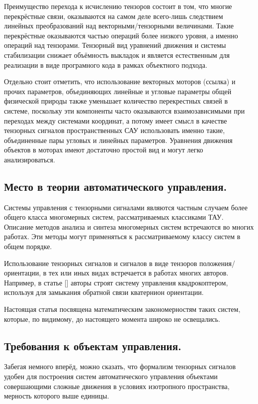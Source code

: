 \documentclass[a4paper]{article}
\begin{document}
Преимущество перехода к исчислению тензоров состоит в том, что многие перекрёстные связи, оказываются на самом деле всего-лишь следствием линейных преобразований над векторными/тензорными величинами. Такие перекрёстные оказываются частью операций более низкого уровня, а именно операций над тензорами. Тензорный вид уравнений движения и системы стабилизации снижает объёмность выкладок и является естественным для реализации в виде програмного кода в рамках объектного подхода. 

Отдельно стоит отметить, что использование векторных моторов (ссылка) и прочих параметров, объединяющих линейные и угловые параметры общей физической природы также уменьшает количество перекрестных связей в системе, поскольку эти компоненты часто оказываются взаимозависимыми при переходах между системами координат, а потому имеет смысл в качестве тензорных сигналов пространственных САУ использовать именно такие, объединенные пары угловых и линейных параметров. Уравнения движения объектов в моторах имеют достаточно простой вид и могут легко анализироваться.

\subsection{Место в теории автоматического управления.}
Системы управления с тензорными сигналами являются частным случаем более общего класса многомерных систем, рассматриваемых классиками ТАУ. Описание методов анализа и синтеза многомерных систем встречаются во многих работах. Эти методы могут применяться к рассматриваемому классу систем в общем порядке. 

Использование тензорных сигналов и сигналов в виде тензоров положения/ориентации, в тех или иных видах встречается в работах многих авторов. Например, в статье [] авторы строят систему управления квадрокоптером, используя для замыкания обратной связи кватернион ориентации. 

Настоящая статья посвящена математическим закономерностям таких систем, которые, по видимому, до настоящего момента широко не освещались.

\subsection{Требования к объектам управления.}
Забегая немного вперёд, можно сказать, что формализм тензорных сигналов удобен для построения систем автоматического управления объектами совершающими сложные движения в условиях изотропного пространства, мерность которого выше единицы.
\end{document}
